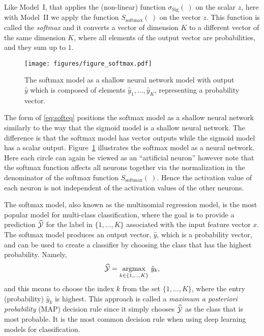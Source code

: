 Like Model~I, that applies the (non-linear) function $\sigma_{\text{Sig}}(~)$ on the scalar $z$, here with Model~II we apply the function $S_{\textrm{softmax}}(~)$ on the vector $z$. This function is called the {\em softmax} and it converts a vector of dimension $K$ to a different vector of the same dimension $K$, where all elements of the output vector are probabilities, and they sum up to $1$.

\begin{figure}[h]
\begin{center}
\texttt{[image: figures/figure\_softmax.pdf]}%
\end{center}
\caption{The softmax model as a shallow neural network model with output $\hat{y}$ which is composed of elements $\hat{y}_1, \ldots, \hat{y}_K$,  representing a probability vector. }
\label{fig:shalsoft}
\end{figure}

The form of \eqref{eq:softeq} positions the softmax model as a shallow neural network similarly to the way that the sigmoid model is a shallow neural network. The difference is that the softmax model has vector outputs while the sigmoid model has a scalar output. Figure~\ref{fig:shalsoft} illustrates the softmax model as a neural network. Here each circle can again be viewed as an ``artificial neuron'' however note that the softmax function %
affects all neurons together via the normalization in the denominator of the softmax function $S_{\textrm{softmax}}(~)$. Hence the activation value of each neuron is not independent of the activation values of the other neurons.

The softmax model, also known as the multinomial regression model, is the most popular model for multi-class classification, where the goal is to provide a prediction $\widehat{\cal Y}$ for the label in $\{1,\ldots,K\}$ associated with the input feature vector $x$.  The softmax model produces an output vector, $\hat{y}$, which is a probability vector, and can be used to create a classifier by choosing the class that has the highest probability. Namely,
%
\begin{equation}
\label{eq:argmax-mp}
\widehat{\cal Y}=\underset{k \in\{1, \ldots, K\}}{\operatorname{argmax}} ~\hat{y}_k,
\end{equation}
%
and this means to choose the index $k$ from the set $\{1,\ldots,K\}$, where the entry (probability) $\hat{y}_k$ is highest. 
This approach is called a \textit{maximum a posteriori probability} (MAP) decision rule since it simply chooses $\widehat{\cal Y}$ as the class that is most probable. It is the most common decision rule when using deep learning models for classification. \\

